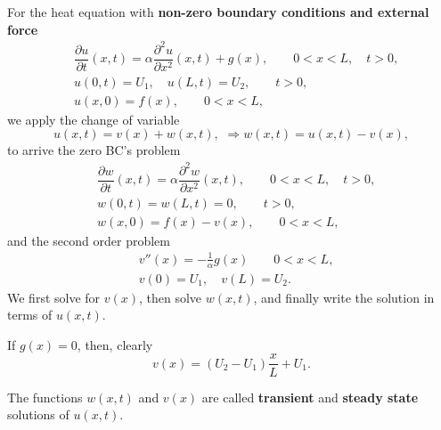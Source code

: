 \documentclass[11pt]{article}
\begin{document}
\begin{preamble}
\begin{formulaitem}
\item For the heat equation with \textbf{non-zero boundary conditions and external force}
\begin{equation*} \begin{split}
& \dfrac{\partial u }{\partial t } (x,t) = \alpha\dfrac{\partial^2 u}{\partial x^2}(x,t) + g(x), \qquad 0<x<L, \quad t>0, \\
& u(0,t) = U_{1}, \quad u(L,t)= U_{2}, \qquad t>0, \\
& u(x,0) = f(x), \qquad 0<x<L,
\end{split}\end{equation*}
we apply the change of variable
\[u(x,t)=v(x)+w(x,t), \,\, \Rightarrow w(x,t)=u(x, t)-v(x),\]
to arrive the zero BC's problem
\begin{equation*} \begin{split}
& \dfrac{\partial w }{\partial t } (x,t) = \alpha\dfrac{\partial^2 w}{\partial x^2}(x,t), \qquad 0<x<L, \quad t>0, \\
& w(0,t) = w(L,t)= 0, \qquad t>0, \\
& w(x,0) = f(x) - v(x), \qquad 0<x<L,
\end{split}\end{equation*}
and the second order problem
\begin{equation*} \begin{split}
& v''(x) = -\tfrac{1}{\alpha}g(x) \qquad 0<x<L, \\
& v(0) = U_{1}, \quad v(L)= U_{2}.
\end{split}\end{equation*}
We first solve for $v(x)$, then solve $w(x,t)$, and finally write the solution in terms of $u(x,t)$.

If $g(x)=0$, then, clearly
\[v(x)=(U_{2}-U_{1})\frac{x}{L}+U_{1}.\]

The functions $w(x, t)$ and $v(x)$ are called \textbf{transient} and \textbf{steady state} solutions of $u(x,t)$.
\end{formulaitem}
\end{preamble}
\end{document}

